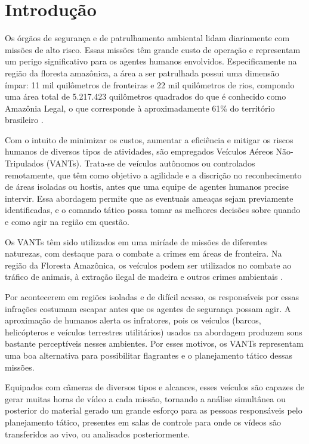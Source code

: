 \chapter{Introdução}

Os órgãos de segurança e de patrulhamento ambiental lidam diariamente com missões de alto risco. Essas missões têm grande custo de operação e representam um perigo significativo para os agentes humanos envolvidos. Especificamente na região da floresta amazônica, a área a ser patrulhada possui uma dimensão ímpar: 11 mil quilômetros de fronteiras e 22 mil quilômetros de rios, compondo uma área total de 5.217.423 quilômetros quadrados do que é conhecido como Amazônia Legal, o que corresponde à aproximadamente 61\% do território brasileiro \cite{ibge}.

Com o intuito de minimizar os custos, aumentar a eficiência e mitigar os riscos humanos de diversos tipos de atividades, são empregados Veículos Aéreos Não-Tripulados (VANTs). Trata-se de veículos autônomos ou controlados remotamente, que têm como objetivo a agilidade e a discrição no reconhecimento de áreas isoladas ou hostis, antes que uma equipe de agentes humanos precise intervir. Essa abordagem permite que as eventuais ameaças sejam previamente identificadas, e o comando tático possa tomar as melhores decisões sobre quando e como agir na região em questão.

Os VANTs têm sido utilizados em uma miríade de missões de diferentes naturezas, com destaque para o combate a crimes em áreas de fronteira. Na região da Floresta Amazônica, os veículos podem ser utilizados no combate ao tráfico de animais, à extração ilegal de madeira e outros crimes ambientais \cite{silva:2013}.

Por acontecerem em regiões isoladas e de difícil acesso, os responsáveis por essas infrações costumam escapar antes que os agentes de segurança possam agir. A aproximação de humanos alerta os infratores, pois os veículos (barcos, helicópteros e veículos terrestres utilitários) usados na abordagem produzem sons bastante perceptíveis nesses ambientes. Por esses motivos, os VANTs representam uma boa alternativa para possibilitar flagrantes e o planejamento tático dessas missões.

Equipados com câmeras de diversos tipos e alcances, esses veículos são capazes de gerar muitas horas de vídeo a cada missão, tornando a análise simultânea ou posterior do material gerado um grande esforço para as pessoas responsáveis pelo planejamento tático, presentes em salas de controle para onde os vídeos são transferidos ao vivo, ou analisados posteriormente.

